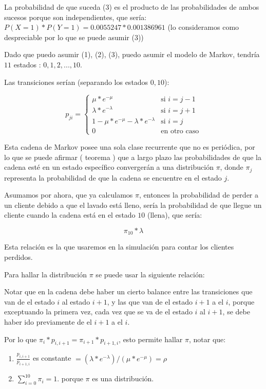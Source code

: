 \documentclass[14pt]{extarticle}
\begin{document}
La probabilidad de que suceda (3) es el producto de las probabilidades de ambos sucesos porque son independientes, que sería: $P( X = 1) * P( Y = 1) = 0.0055247 * 0.001386961$ (lo consideramos como despreciable por lo que se puede asumir (3))
	
Dado que puedo asumir (1), (2), (3), puedo asumir el modelo de Markov, tendría $11$ estados : ${0, 1, 2, ..., 10}$.

Las transiciones serían (separando los estados $0, 10$):

$$
p_{ji} = \begin{cases}
  \mu * e^{-\mu} & \text{si $i = j-1$} \\
  \lambda * e^{-\lambda} & \text{si $i = j+1$} \\
  1 - \mu * e^{-\mu} - \lambda * e^{-\lambda} & \text{si $i = j$} \\
  0 & \text{en otro caso}
        \end{cases}
$$

Esta cadena de Markov posee una sola clase recurrente que no es periódica, por lo que se puede afirmar ( teorema ) que a largo plazo las probabilidades de que la cadena esté en un estado específico convergerán a una distribución $\pi$, donde $\pi_j$ representa la probabilidad de que la cadena se encuentre en el estado $j$. 

Asumamos por ahora, que ya calculamos $\pi$, entonces la probabilidad de perder a un cliente debido a que el lavado está lleno, sería la probabilidad de que llegue un cliente cuando la cadena está en el estado $10$ (llena), que sería:

$$\pi_{10} * \lambda $$

Esta relación es la que usaremos en la simulación para contar los clientes perdidos.

Para hallar la distribución $\pi$ se puede usar la siguiente relación:

Notar que en la cadena debe haber un cierto balance entre las transiciones que van de el estado $i$ al estado $i+1$, y las que van de el estado $i+1$ a el $i$, porque exceptuando la primera vez, cada vez que se va de el estado $i$ al $i+1$, se debe haber ido previamente de el $i+1$ a el $i$.

Por lo que $\pi_i * p_{i, i+1} = \pi_{i+1} * p_{i+1, i}$, esto permite hallar $\pi$, notar que:

\begin{enumerate}
    \item $\frac{p_{i, i+1}}{p_{i+1, i}}$ es constante $= (\lambda * e^{-\lambda})/(\mu * e^{-\mu}) = \rho$
    \item $\sum_{i = 0}^{10} \pi_i = 1$. porque $\pi$ es una distribución.
\end{enumerate}
\end{document}
